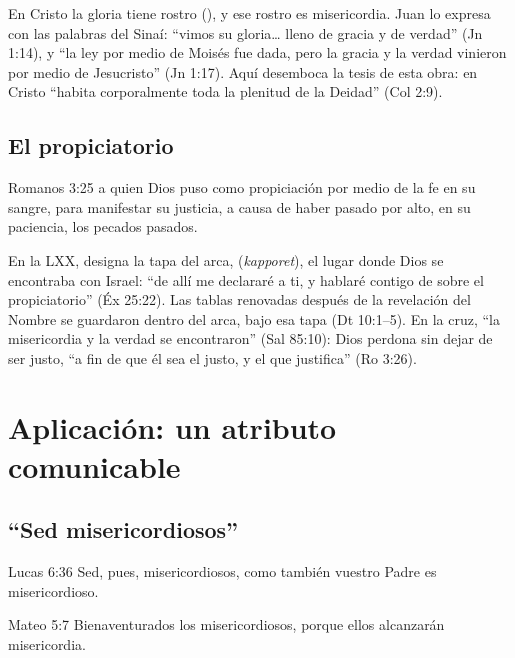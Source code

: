 En Cristo la gloria tiene rostro (), y ese rostro es misericordia. Juan lo expresa con las palabras del Sinaí: ``vimos su gloria\ldots{} lleno de gracia y de verdad'' (Jn 1:14), y ``la ley por medio de Moisés fue dada, pero la gracia y la verdad vinieron por medio de Jesucristo'' (Jn 1:17). Aquí desemboca la tesis de esta obra: en Cristo ``habita corporalmente toda la plenitud de la Deidad'' (Col 2:9).


\subsection{El propiciatorio}
\begin{verso}{Romanos 3:25}
a quien Dios puso como propiciación por medio de la fe en su sangre, para manifestar su justicia, a causa de haber pasado por alto, en su paciencia, los pecados pasados.
\end{verso}

En la LXX,  designa la tapa del arca,  (\emph{kapporet}), el lugar donde Dios se encontraba con Israel: ``de allí me declararé a ti, y hablaré contigo de sobre el propiciatorio'' (Éx 25:22). Las tablas renovadas después de la revelación del Nombre se guardaron dentro del arca, bajo esa tapa (Dt 10:1--5). En la cruz, ``la misericordia y la verdad se encontraron'' (Sal 85:10): Dios perdona sin dejar de ser justo, ``a fin de que él sea el justo, y el que justifica'' (Ro 3:26).


\section{Aplicación: un atributo comunicable}

\subsection{“Sed misericordiosos”}
\begin{verso}{Lucas 6:36}
Sed, pues, misericordiosos, como también vuestro Padre es misericordioso.
\end{verso}
\begin{verso}{Mateo 5:7}
Bienaventurados los misericordiosos, porque ellos alcanzarán misericordia.
\end{verso}

